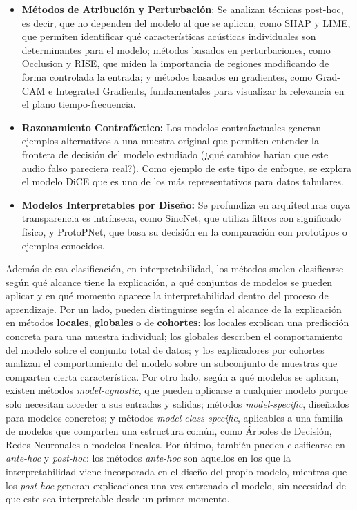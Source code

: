 \begin{itemize}
    \item \textbf{Métodos de Atribución y Perturbación}: Se analizan técnicas post-hoc, es decir, que no dependen del modelo al que se aplican, como SHAP y LIME, que permiten identificar qué características acústicas individuales son determinantes para el modelo; métodos basados en perturbaciones, como Occlusion y RISE, que miden la importancia de regiones modificando de forma controlada la entrada; y métodos basados en gradientes, como Grad-CAM e Integrated Gradients, fundamentales para visualizar la relevancia en el plano tiempo-frecuencia.

    \item \textbf{Razonamiento Contrafáctico:} Los modelos contrafactuales generan ejemplos alternativos a una muestra original que permiten entender la frontera de decisión del modelo estudiado (¿qué cambios harían que este audio falso pareciera real?). Como ejemplo de este tipo de enfoque, se explora el modelo DiCE que es uno de los más representativos para datos tabulares.

    \item \textbf{Modelos Interpretables por Diseño:} Se profundiza en arquitecturas cuya transparencia es intrínseca, como SincNet, que utiliza filtros con significado físico, y ProtoPNet, que basa su decisión en la comparación con prototipos o ejemplos conocidos.
\end{itemize}

Además de esa clasificación, en interpretabilidad, los métodos suelen clasificarse según qué alcance tiene la explicación, a qué conjuntos de modelos se pueden aplicar y en qué momento aparece la interpretabilidad dentro del proceso de aprendizaje.
Por un lado, pueden distinguirse según el alcance de la explicación en métodos \textbf{locales}, \textbf{globales} o de \textbf{cohortes}: los locales explican una predicción concreta para una muestra individual; los globales describen el comportamiento del modelo sobre el conjunto total de datos; y los explicadores por cohortes analizan el comportamiento del modelo sobre un subconjunto de muestras que comparten cierta característica.
Por otro lado, según a qué modelos se aplican, existen métodos \textit{model-agnostic}, que pueden aplicarse a cualquier modelo porque solo necesitan acceder a sus entradas y salidas; métodos \textit{model-specific}, diseñados para modelos concretos; y métodos \textit{model-class-specific}, aplicables a una familia de modelos que comparten una estructura común, como Árboles de Decisión, Redes Neuronales o modelos lineales.
Por último, también pueden clasificarse en \textit{ante-hoc} y \textit{post-hoc}: los métodos \textit{ante-hoc} son aquellos en los que la interpretabilidad viene incorporada en el diseño del propio modelo, mientras que los \textit{post-hoc} generan explicaciones una vez entrenado el modelo, sin necesidad de que este sea interpretable desde un primer momento.

